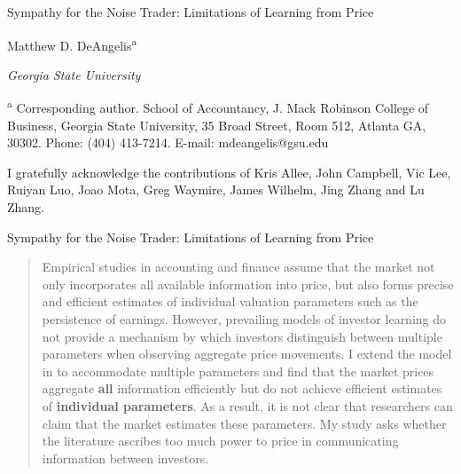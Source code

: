 \documentclass[11pt]{article}
\author{Matt DeAngelis}
\date{\today}
\title{}
\begin{document}
\begin{titlepage}
\singlespacing
\begin{center}
\LARGE Sympathy for the Noise Trader: Limitations of Learning from Price
\vspace*{35mm}

\normalsize Matthew D. DeAngelis\textsuperscript{a}

\textit{Georgia State University}
\end{center}

\vspace*{\fill}
\textsuperscript{a} Corresponding author. School of Accountancy, J. Mack Robinson College of Business, Georgia State University, 35 Broad Street, Room 512, Atlanta GA, 30302. Phone: (404) 413-7214. E-mail: mdeangelis@gsu.edu

\vspace*{10mm}
I gratefully acknowledge the contributions of Kris Allee, John Campbell, Vic Lee, Ruiyan Luo, Joao Mota, Greg Waymire, James Wilhelm, Jing Zhang and Lu Zhang. 
\end{titlepage}

\newpage

\begin{center}
\LARGE Sympathy for the Noise Trader: Limitations of Learning from Price
\end{center}
\vspace*{40mm}
\begin{abstract}


Empirical studies in accounting and finance assume that the market not only incorporates all available information into price, but also forms precise and efficient estimates of individual valuation parameters such as the persistence of earnings. However, prevailing models of investor learning do not provide a mechanism by which investors distinguish between multiple parameters when observing aggregate price movements. I extend the model in \citet{grossmanImpossibilityInformationallyEfficient1980} to accommodate multiple parameters and find that the market prices aggregate \textbf{all} information efficiently but do not achieve efficient estimates of \textbf{individual parameters}. As a result, it is not clear that researchers can claim that the market estimates these parameters. My study asks whether the literature ascribes too much power to price in communicating information between investors.
\end{abstract}
\newpage
\end{document}
